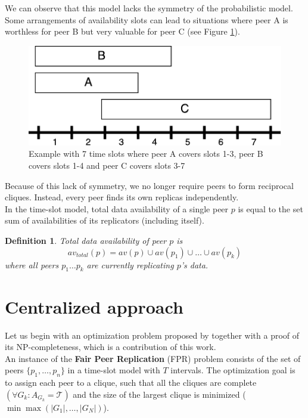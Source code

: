 \documentclass{pracamgren}
\newcounter{collective_ctr} \numberwithin{collective_ctr}{chapter}
\newtheorem{definition}[collective_ctr]{Definition}
\begin{document}
We can observe that this model lacks the symmetry of the probabilistic model. Some arrangements of availability slots can lead to situations where peer A is worthless for peer B but very valuable for peer C (see Figure \ref{fig:abc}).\\

\begin{figure}[h]
\centering
\includegraphics{abc.pdf}
\caption{Example with 7 time slots where peer A covers slots 1-3, peer B covers slots 1-4 and peer C covers slots 3-7}
\label{fig:abc}
\end{figure}

Because of this lack of symmetry, we no longer require peers to form reciprocal cliques. Instead, every peer finds its own replicas independently.\\

In the time-slot model, total data availability of a single peer $p$ is equal to the set sum of availabilities of its replicators (including itself).

\begin{definition}
Total data availability of peer $p$ is
$$av_{total}(p) = av(p) \cup av(p_1) \cup \ldots \cup av(p_k)$$
where all peers $p_1\ldots p_k$ are currently replicating $p$'s data.
\end{definition}
 
\section{Centralized approach}\label{sect:centralized}


Let us begin with an optimization problem proposed by \cite{krz} together with a proof of its NP-completeness, which is a contribution of this work.\\

An instance of the {\bf Fair Peer Replication} (FPR) problem consists of the set of peers $\{p_1,\ldots,p_n\}$ in a time-slot model with $T$ intervals. The optimization goal is to assign each peer to a clique, such that all the cliques are complete $(\forall G_k:A_{G_k} = \mathcal{T})$ and the size of the largest clique is minimized ($\min\max(|G_1|,\ldots,|G_N|)$).\\
\end{document}
